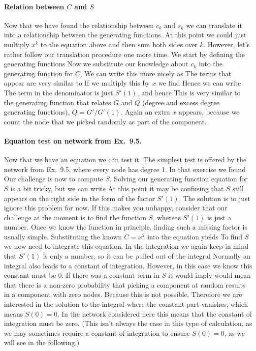 \paragraph{Relation between $C$ and $S$}Now that we have found the relationship between $c_k$ and $s_k$ we can translate it into a relationship between the generating functions. At this point we could just multiply $x^k$ to the equation above and then sum both sides over $k$. However, let's rather follow our translation procedure one more time. We start by defining the generating functions
Now we substitute our knowledge about $c_k$ into the generating function for $C$,
We can write this more nicely as 
The terms that appear are very similar to 
If we multiply this by $x$ we find
Hence we can write 
The term in the denominator is just $S'(1)$, and hence
This is very similar to the generating function that relates $G$ and $Q$ (degree and excess degree generating functions), $Q=G'/G'(1)$. Again an extra $x$ appears, because we count the node that we picked randomly 
as part of the component. 

\paragraph{Equation test on network from Ex.~9.5.}Now that we have an equation we can test it. The simplest test is offered by the network from Ex.~9.5, where every node has degree 1. In that exercise we found 
Our challenge is now to compute $S$. Solving our generating function equation for $S$ is a bit tricky, but we can write
At this point it may be confusing that $S$ still appears on the right side in the form of the factor $S'(1)$. The solution is to just ignore this problem for now. If this makes you unhappy, consider that our challenge at the moment is to find the function $S$, whereas $S'(1)$ is just a number. Once we know the function in principle, finding such a missing factor is usually simple. Substituting the known $C=x^2$ into the equation yields
To find $S$ we now need to integrate this equation. In the integration we again keep in mind that $S'(1)$ is only a number, so it can be pulled out of the integral
Normally an integral also leads to a constant of integration. However, in this case we know this constant must be 0.  If there was a constant term in $S$ it would imply would mean that there is a non-zero probability that picking a component at random results in a component with zero nodes. Because this is not possible. Therefore we are interested in the solution to the integral where the constant part vanishes, which means $S(0)=0$. In the network considered here this means that the constant of integration must be zero. (This isn't always the case in this type of calculation, as we may sometimes require a constant of integration to ensure $S(0)=0$, as we will see in the following.) 

